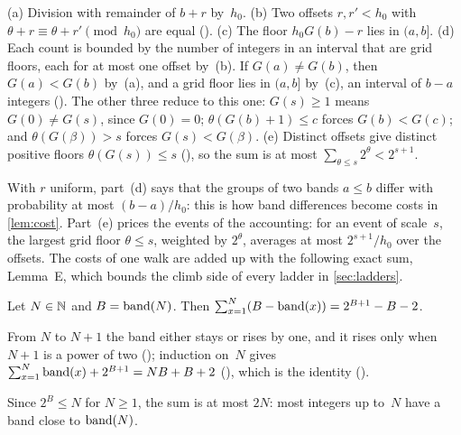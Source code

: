 \begin{outline}
(a) Division with remainder of $b+r$ by~$h_0$. (b) Two offsets $r,r'<h_0$ with $\theta+r\equiv\theta+r'\pmod{h_0}$ are equal
(). (c) The floor
$h_0G(b)-r$ lies in $(a,b]$. (d) Each count is bounded by the number of integers in an interval that are grid floors, each for
at most one offset by~(b). If $G(a)\ne G(b)$, then $G(a)<G(b)$ by~(a), and a grid floor lies in $(a,b]$ by~(c), an interval of
$b-a$ integers (). The other three reduce to this one: $G(s)\ge1$ means $G(0)\ne G(s)$, since $G(0)=0$;
$\theta(G(b)+1)\le c$ forces $G(b)<G(c)$; and $\theta(G(\beta))>s$ forces $G(s)<G(\beta)$. (e) Distinct offsets give distinct
positive floors $\theta(G(s))\le s$ (), so the sum is at most $\sum_{\theta\le s}2^\theta<2^{s+1}$.
\end{outline}

With $r$ uniform, part~(d) says that the groups of two bands $a\le b$ differ with probability at most $(b-a)/h_0$: this is how
band differences become costs in \cref{lem:cost}. Part~(e) prices the events of the accounting: for an event of scale~$s$, the
largest grid floor $\theta\le s$, weighted by $2^\theta$, averages at most $2^{s+1}/h_0$ over the offsets. The costs of one walk
are added up with the following exact sum, Lemma~E, which bounds the climb side of every ladder in \cref{sec:ladders}.

\begin{lemma}\label{lem:bandsums}
Let $N\in\mathbb{N}$ and $B=\operatorname{band}(N)$. Then $\sum_{x=1}^{N}(B-\operatorname{band}(x))=2^{B+1}-B-2$.
\end{lemma}

\begin{outline}
From $N$ to $N+1$ the band either stays or rises by one, and it rises only when $N+1$ is a power of two
(); induction on~$N$ gives $\sum_{x=1}^{N}\operatorname{band}(x)+2^{B+1}=NB+B+2$ (), which is the
identity ().
\end{outline}

Since $2^B\le N$ for $N\ge1$, the sum is at most $2N$: most integers up to~$N$ have a band close to $\operatorname{band}(N)$.

